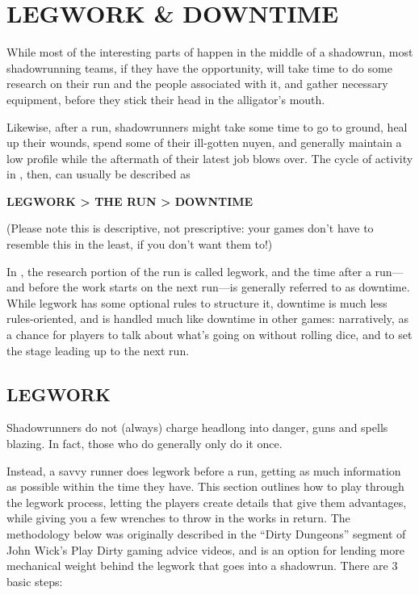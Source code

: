 \documentclass[oneside,10pt]{article}
\begin{document}
\section{LEGWORK \& DOWNTIME}
\begin{multicols}{2}
While most of the interesting parts of \SW{} happen
in the middle of a shadowrun, most shadowrunning teams, if
they have the opportunity, will take time to do some research
on their run and the people associated with it, and gather
necessary equipment, before they stick their head in the alligator’s mouth.

Likewise, after a run, shadowrunners might take some time
to go to ground, heal up their wounds, spend some of their
ill-gotten nuyen, and generally maintain a low profile while
the aftermath of their latest job blows over. The
cycle of activity in \SW{}, then, can usually be
described as

\begin{adjustwidth*}{1cm}{2cm}
{\orbitronfont \textbf{LEGWORK > THE RUN > DOWNTIME}}
\end{adjustwidth*}

(Please note this is descriptive, not prescriptive: your games
don’t have to resemble this in the least, if you don’t want
them to!)

In \SW{}, the research portion of the run is called legwork, and the time after a run—and before the work starts on
the next run—is generally referred to as downtime. While
legwork has some optional rules to structure it, downtime is
much less rules-oriented, and is handled much like downtime
in other games: narratively, as a chance for players to talk
about what’s going on without rolling dice, and to set the
stage leading up to the next run.

\subsection{LEGWORK}
Shadowrunners do not (always) charge headlong into danger,
guns and spells blazing. In fact, those who do generally only
do it once.

Instead, a savvy runner does legwork before a run, getting as
much information as possible within the time they have. This
section outlines how to play through the legwork process,
letting the players create details that give them advantages,
while giving you a few wrenches to throw in the works in return. The methodology below was originally described in the
“Dirty Dungeons” segment of John Wick’s Play Dirty gaming
advice videos, and is an option for lending more mechanical
weight behind the legwork that goes into a shadowrun. There
are 3 basic steps:


\end{multicols}
\end{document}
